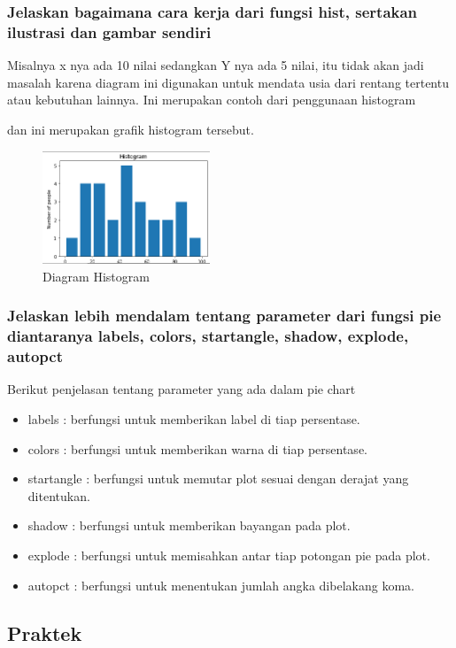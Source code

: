 \subsubsection{Jelaskan bagaimana cara kerja dari fungsi hist, sertakan ilustrasi dan gambar sendiri}
\hfill \break
Misalnya x nya ada 10 nilai sedangkan Y nya ada 5 nilai, itu tidak akan jadi masalah karena diagram ini digunakan untuk mendata usia dari rentang tertentu atau kebutuhan lainnya.
Ini merupakan contoh dari penggunaan histogram

dan ini merupakan grafik histogram tersebut.
\begin{figure}[H]	
    \includegraphics[width=5cm]{figures/6/1154016/teori/histogram.png}
    \centering
    \caption{Diagram Histogram}
\end{figure}
\subsubsection{Jelaskan lebih mendalam tentang parameter dari fungsi pie diantaranya labels, colors, startangle, shadow, explode, autopct}
\hfill \break
Berikut penjelasan tentang parameter yang ada dalam pie chart
 \begin{itemize}
 	\item labels : berfungsi untuk memberikan label di tiap persentase.
 	\item colors : berfungsi untuk memberikan warna di tiap persentase.
 	\item startangle : berfungsi untuk memutar plot sesuai dengan derajat yang ditentukan.
 	\item shadow : berfungsi untuk memberikan bayangan pada plot.
 	\item explode : berfungsi untuk memisahkan antar tiap potongan pie pada plot.
 	\item autopct : berfungsi untuk menentukan jumlah angka dibelakang koma.
 \end{itemize}

\subsection{Praktek}
